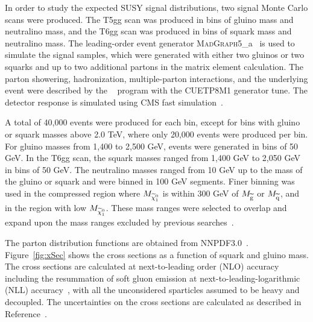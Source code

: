 In order to study the expected SUSY signal distributions, two
signal Monte Carlo scans were produced.
The T5gg scan was produced in bins of gluino mass and neutralino mass,
and the T6gg scan was produced in bins of squark mass and neutralino mass.
The leading-order event generator \textsc{MadGraph}5\_a\MCATNLO~\cite{Alwall:2014hca}
is used to simulate the signal samples, which
were generated with either two gluinos or two squarks and up to two additional
partons in the matrix element calculation. The parton showering, hadronization,
multiple-parton interactions, and the underlying event were described by the
~\cite{Sjostrand:2007gs} program with the CUETP8M1 generator tune.
The detector response is simulated using
CMS fast simulation~\cite{Abdullin:2011zz}.

A total of 40,000 events were produced for
each bin, except for bins with gluino or squark masses above 2.0 TeV, where only
20,000 events were produced per bin.
For gluino masses from 1,400 to 2,500 GeV, events were generated
in bins of 50 GeV.  In the T6gg scan, the squark masses ranged from
1,400 GeV to 2,050 GeV in bins of 50 GeV.
The neutralino masses ranged from 10 GeV up to the mass
of the gluino or squark and were binned in
100 GeV segments. Finer binning was used in the compressed region where
$M_{\widetilde{\chi}^{0}_{1}}$ is within 300 GeV of $M_{\widetilde{\mathrm{g}}}$ or $M_{\widetilde{\mathrm{q}}}$,
and in the region with low $M_{\widetilde{\chi}^{0}_{1}}$.
These mass ranges were selected to overlap and
expand upon the mass ranges excluded by previous
searches~\cite{ATLAS:2016aa,CMS:2015_anal}.

The parton distribution
functions are obtained from NNPDF3.0~\cite{Ball:2014uwa}.
Figure~\ref{fig:xSec} shows the cross sections as a function
of squark and gluino mass.
The cross sections are calculated at next-to-leading order 
(NLO) accuracy including the resummation of soft gluon emission
at next-to-leading-logarithmic (NLL) accuracy~\cite{Kulesza:2009kq, Beenakker:2009ha},
with all the unconsidered sparticles assumed to be heavy and decoupled.
The uncertainties on the cross sections are calculated as
described in Reference~\cite{Borschensky:2014cia}.


